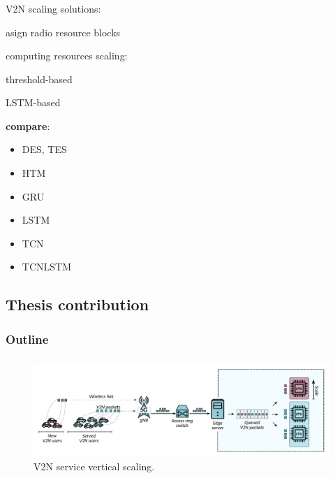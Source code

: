 \documentclass[aspectratio=169]{beamer}
\begin{document}
\begin{frame}
    \frametitle{\secname}
    \framesubtitle{\subsecname}

    V2N scaling solutions:
    \begin{itemize}
        \item asign radio resource blocks~\cite{pi-road}
        \item computing resources scaling:
            \begin{itemize}
                \item threshold-based~\cite{5gt-v2x,luis-v2x}
                \item LSTM-based~\cite{automec}
                \pause
                {\color{red}\item  \textbf{compare}:
                    \begin{itemize}
                        \item \color{red} DES, TES
                        \item \color{red} HTM
                        \item \color{red} GRU
                        \item \color{red} LSTM
                        \item \color{red} TCN
                        \item \color{red} TCNLSTM
                    \end{itemize}
                }
            \end{itemize}
    \end{itemize}
\end{frame}





\subsection{Thesis contribution}
\begin{frame}
    \frametitle{Outline}
    \tableofcontents[subsectionstyle=show/shaded/hide,sectionstyle=show/shaded]
\end{frame}


\begin{frame}
    \frametitle{\secname}
    \framesubtitle{\subsecname}

    \begin{figure}
        \includegraphics[width=\textwidth]{img/v2n-scaling-scenario.pdf}
        \caption{V2N service vertical scaling.}
    \end{figure}
\end{frame}
\end{document}
